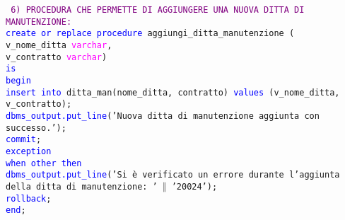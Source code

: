 \documentclass{article}
\begin{document}
    \begin{flushleft}
        \texttt{
        \textcolor{purple}{6) PROCEDURA CHE PERMETTE DI AGGIUNGERE UNA NUOVA DITTA DI MANUTENZIONE:} \\
        \hspace*{2em} \textcolor{blue}{create or replace procedure} aggiungi\_ditta\_manutenzione ( \\
        \hspace*{4em}v\_nome\_ditta \textcolor{magenta}{varchar}, \\
        \hspace*{4em}v\_contratto \textcolor{magenta}{varchar}) \\
        \hspace*{2em}\textcolor{blue}{is} \\
        \hspace*{2em}\textcolor{blue}{begin} \\
        \hspace*{4em}\textcolor{blue}{insert into} ditta\_man(nome\_ditta, contratto) \textcolor{blue}{values} (v\_nome\_ditta, \hspace*{4em}v\_contratto); \\
        \hspace*{4em}\textcolor{blue}{dbms\_output.put\_line}('Nuova ditta di manutenzione aggiunta con \hspace*{4em}successo.'); \\
        \hspace*{4em}\textcolor{blue}{commit}; \\
        \hspace*{2em}\textcolor{blue}{exception} \\
        \hspace*{4em}\textcolor{blue}{when other then} \\
        \hspace*{6em}\textcolor{blue}{dbms\_output.put\_line}('Si è verificato un errore durante l'aggiunta \hspace*{6em}della ditta di manutenzione: ' $\Vert$ '20024'); \\
        \hspace*{4em}\textcolor{blue}{rollback}; \\
        \hspace*{2em}\textcolor{blue}{end}; \\
        }
    \end{flushleft}
\end{document}
